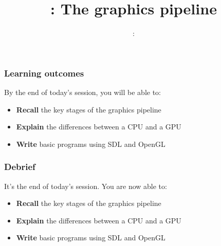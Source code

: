 \usepackage{../../beamerthemeFalmouthGamesAcademy}
\usepackage{multimedia}
\graphicspath{ {../../} }


\usepackage[normalem]{ulem}
\usepackage{wasysym}

\usepackage{pdfpages}

\usetikzlibrary{arrows,automata}




\title{\sessionnumber: The graphics pipeline}
\subtitle{\modulecode: \moduletitle}

\frame{\titlepage} 

\begin{frame}
	\frametitle{Learning outcomes}
	By the end of today's session, you will be able to:
	\begin{itemize}
		\item \textbf{Recall} the key stages of the graphics pipeline
		\item \textbf{Explain} the differences between a CPU and a GPU
		\item \textbf{Write} basic programs using SDL and OpenGL
	\end{itemize}
\end{frame}









\begin{frame}
	\frametitle{Debrief}
	It's the end of today's session. You are now able to:
	\begin{itemize}
		\item \textbf{Recall} the key stages of the graphics pipeline
		\item \textbf{Explain} the differences between a CPU and a GPU
		\item \textbf{Write} basic programs using SDL and OpenGL
	\end{itemize}
\end{frame}


